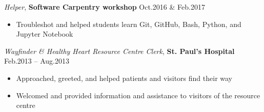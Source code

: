 \documentclass{res}
\renewcommand{\section}[1]{%
  \vspace{0.3in}%
  \centerline{\uppercase{\bf{#1}}}%
  \vspace{-6pt}}
\newcommand{\linevolunteer}[3]{%
  {\sl #3}, {\bf #2} \hfill #1}%
\begin{document}
\begin{resume}
\linevolunteer{Oct.2016 \& Feb.2017}{%
  Software Carpentry workshop}{%
  Helper}
\begin{itemize}
  \item Troubleshot and helped students learn Git, GitHub, Bash, Python, and Jupyter Notebook
\end{itemize}

\linevolunteer{Feb.2013 -- Aug.2013}{%
  St. Paul's Hospital}{%
  Wayfinder \& Healthy Heart Resource Centre Clerk}
\begin{itemize}
  \item Approached, greeted, and helped patients and visitors find their way
  \item Welcomed and provided information and assistance to visitors of the resource centre
\end{itemize}


\end{resume}
\end{document}
